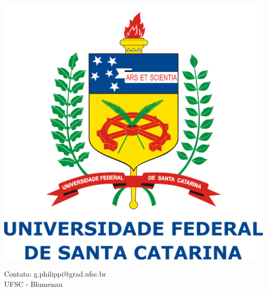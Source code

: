 \documentclass[10pt]{beamer}
\theoremstyle{plain}
\theoremstyle{definition}
\begin{document}
\begin{frame}
\begin{center}
			\vspace{-2.7cm}
			\hspace{5.5cm}
			\includegraphics[scale=0.038]{logo_ufsc.png}
			
			\vspace{0.5cm}
			Contato: g.philippi@grad.ufsc.br\\ UFSC - Blumenau
		\end{center}
	\end{frame}
	
\end{document}

